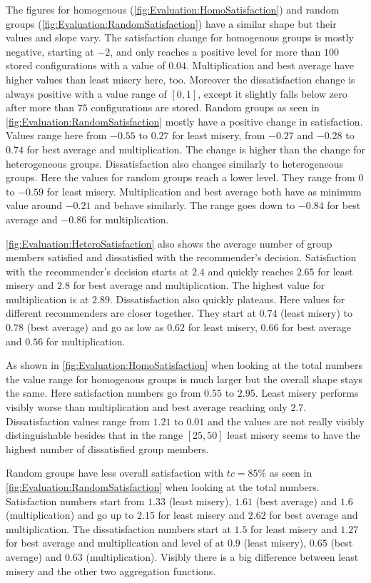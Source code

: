 The figures for homogenous (\autoref{fig:Evaluation:HomoSatisfaction}) and random groups (\autoref{fig:Evaluation:RandomSatisfaction}) have a similar shape but their values and slope vary. The satisfaction change for homogenous groups is mostly negative, starting at $-2$, and only reaches a positive level for more than $100$ stored configurations with a value of $0.04$. Multiplication and best average have higher values than least misery here, too. Moreover the dissatisfaction change is always positive with a value range of $[0,1]$, except it slightly falls below zero after more than $75$ configurations are stored.
Random groups as seen in \autoref{fig:Evaluation:RandomSatisfaction} mostly have a positive change in satisfaction. Values range here from $-0.55$ to $0.27$ for least misery, from $-0.27$ and $-0.28$ to $0.74$ for best average and multiplication. The change is higher than the change for heterogeneous groups. Dissatisfaction also changes similarly to heterogeneous groups. Here the values for random groups reach a lower level. They range from $0$ to $-0.59$ for least misery. Multiplication and best average both have as minimum value around $-0.21$ and behave similarly. The range goes down to $-0.84$ for best average and $-0.86$ for multiplication.

\autoref{fig:Evaluation:HeteroSatisfaction} also shows the average number of group members satisfied and dissatisfied with the recommender's decision. Satisfaction with the recommender's decision starts at $2.4$ and quickly reaches $2.65$ for least misery and $2.8$ for best average and multiplication. The highest value for multiplication is at $2.89$. Dissatisfaction also  quickly plateaus. Here values for different recommenders are closer together. They start at $0.74$ (least misery) to $0.78$ (best average) and go as low as $0.62$ for least misery, $0.66$ for best average and $0.56$ for multiplication.

As shown in \autoref{fig:Evaluation:HomoSatisfaction} when looking at the total numbers the value range for homogenous groups is much larger but the overall shape stays the same. Here satisfaction numbers go from $0.55$ to $2.95$. Least misery performs visibly worse than multiplication and best average reaching only $2.7$. Dissatisfaction values range from $1.21$ to $0.01$ and the values are not really visibly distinguishable besides that in the range $[25,50]$ least misery seems to have the highest number of dissatisfied group members.

Random groups have less overall satisfaction with $tc = 85\%$ as seen in \autoref{fig:Evaluation:RandomSatisfaction} when looking at the total numbers. Satisfaction numbers start from $1.33$ (least misery), $1.61$ (best average) and $1.6$ (multiplication) and go up to $2.15$ for least misery and $2.62$ for best average and multiplication. The dissatisfaction numbers start at $1.5$ for least misery and $1.27$ for best average and multiplication and level of at $0.9$ (least misery), $0.65$ (best average) and $0.63$ (multiplication). Visibly there is a big difference between least misery and the other two aggregation functions.


